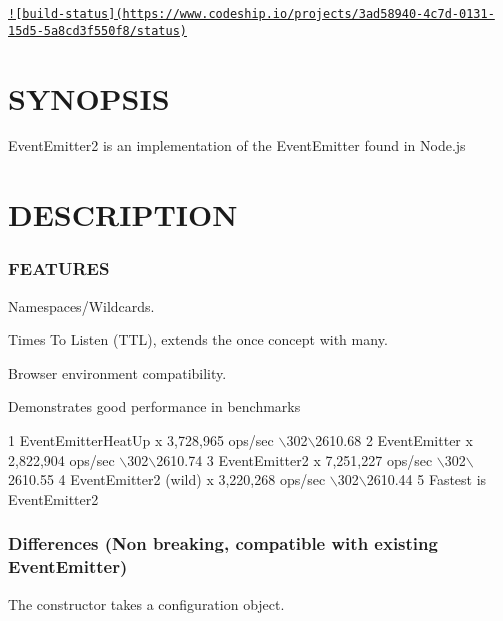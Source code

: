 \href{https://www.codeship.io/projects/11259}{\tt !\mbox{[}build-\/status\mbox{]}(https\+://www.\+codeship.\+io/projects/3ad58940-\/4c7d-\/0131-\/15d5-\/5a8cd3f550f8/status)}

\section*{S\+Y\+N\+O\+P\+S\+I\+S}

Event\+Emitter2 is an implementation of the Event\+Emitter found in Node.\+js

\section*{D\+E\+S\+C\+R\+I\+P\+T\+I\+O\+N}

\subsubsection*{F\+E\+A\+T\+U\+R\+E\+S}


\begin{DoxyItemize}
\item Namespaces/\+Wildcards.
\item Times To Listen (T\+T\+L), extends the {\ttfamily once} concept with {\ttfamily many}.
\item Browser environment compatibility.
\item Demonstrates good performance in benchmarks
\end{DoxyItemize}


\begin{DoxyCode}
1 EventEmitterHeatUp x 3,728,965 ops/sec \(\backslash\)302\(\backslash\)2610.68%
2 EventEmitter x 2,822,904 ops/sec \(\backslash\)302\(\backslash\)2610.74%
3 EventEmitter2 x 7,251,227 ops/sec \(\backslash\)302\(\backslash\)2610.55%
4 EventEmitter2 (wild) x 3,220,268 ops/sec \(\backslash\)302\(\backslash\)2610.44%
5 Fastest is EventEmitter2
\end{DoxyCode}


\subsubsection*{Differences (Non breaking, compatible with existing Event\+Emitter)}


\begin{DoxyItemize}
\item The constructor takes a configuration object.
\end{DoxyItemize}


